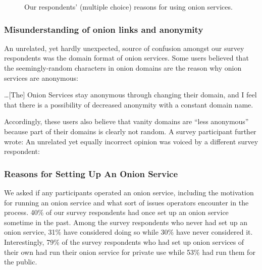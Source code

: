 \begin{figure}[t]
    \centering
    
    \caption{Our respondents' (multiple choice) reasons for using onion
    services.}
    \label{fig:onion-usage}
\end{figure}


\subsubsection{Misunderstanding of onion links and anonymity}
An unrelated, yet hardly unexpected, source of confusion amongst our survey respondents was the domain format of
onion services.  Some users believed that the seemingly-random
characters in onion domains are the reason why onion services are anonymous:

\begin{displayquote}
\ldots [The] Onion Services stay anonymous through changing their domain, and I
feel that there is a possibility of decreased anonymity with a constant domain
name.
\end{displayquote}

Accordingly, these users also believe that vanity domains  are ``less anonymous''
because part of their domains is clearly not random.  A survey participant
further wrote:   An unrelated yet
equally incorrect opinion was voiced by a different survey respondent:

\subsubsection{Reasons for Setting Up An Onion Service}
We asked if any participants operated an onion service, including the motivation for
running an onion service and what sort of issues operators encounter in the
process.  40\% of our survey respondents had once set up an onion service sometime in the past.  Among the survey
respondents who never had set up an onion service, 31\% have considered doing so while 30\% have never
considered it.  Interestingly, 79\% of the survey respondents who had set up onion services of their own had run their onion service for
private use while 53\% had run them for the public.

